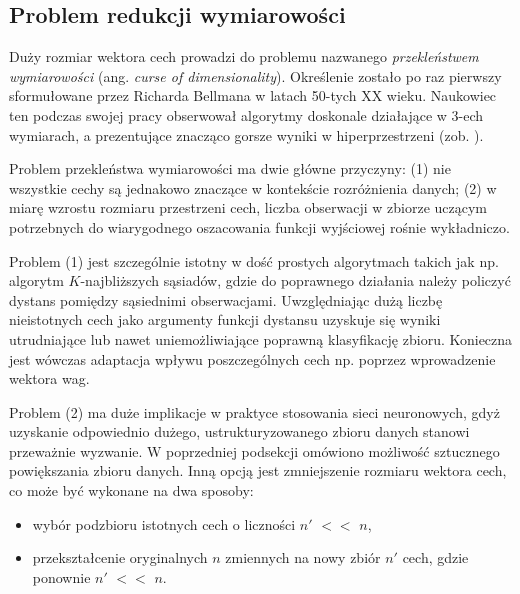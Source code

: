 \subsection{Problem redukcji wymiarowości}
\label{DimReduction}
Duży rozmiar wektora cech prowadzi do problemu nazwanego \textit{przekleństwem wymiarowości} (ang. \textit{curse of dimensionality}). Określenie zostało po raz pierwszy sformułowane przez Richarda Bellmana w latach 50-tych XX wieku. Naukowiec ten podczas swojej pracy obserwował algorytmy doskonale działające w 3-ech wymiarach, a prezentujące znacząco gorsze wyniki w hiperprzestrzeni (zob. \cite{Bellman:1957}). 

Problem przekleństwa wymiarowości ma dwie główne przyczyny: (1) nie wszystkie cechy są jednakowo znaczące w kontekście rozróżnienia danych; (2) w miarę wzrostu rozmiaru przestrzeni cech, liczba obserwacji w zbiorze uczącym potrzebnych do wiarygodnego oszacowania funkcji wyjściowej rośnie wykładniczo.  

Problem (1) jest szczególnie istotny w dość prostych algorytmach takich jak np. algorytm $K$-najbliższych sąsiadów, gdzie do poprawnego działania należy policzyć dystans pomiędzy sąsiednimi obserwacjami. Uwzględniając dużą liczbę nieistotnych cech jako argumenty funkcji dystansu uzyskuje się wyniki utrudniające lub nawet uniemożliwiające poprawną klasyfikację zbioru. Konieczna jest wówczas adaptacja wpływu poszczególnych cech np. poprzez wprowadzenie wektora wag.

Problem (2) ma duże implikacje w praktyce stosowania sieci neuronowych, gdyż uzyskanie odpowiednio dużego, ustrukturyzowanego zbioru danych stanowi przeważnie wyzwanie. W poprzedniej podsekcji omówiono możliwość sztucznego powiększania zbioru danych. Inną opcją jest zmniejszenie rozmiaru wektora cech, co może być wykonane na dwa sposoby:

\begin{itemize}[noitemsep,nolistsep]
\item wybór podzbioru istotnych cech o liczności $n'$ $<<$ $n$,
\item przekształcenie oryginalnych $n$ zmiennych na nowy zbiór $n'$ cech, gdzie ponownie $n'$ $<<$ $n$.
\end{itemize}

